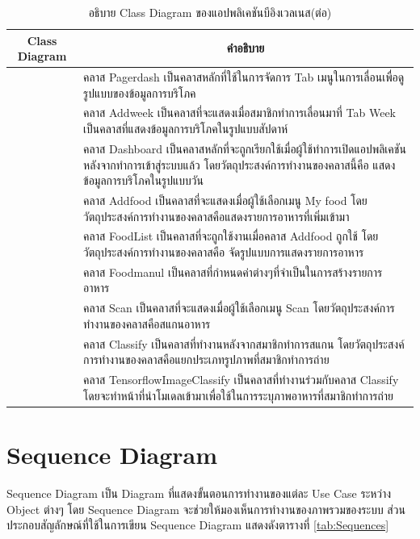 \newpage
\begin{table}[H]
	\centering
	\caption{อธิบาย Class Diagram ของแอปพลิเคชันบีอิงเวลเนส(ต่อ)}
	\label{tab:class}
	\begin{tabular}{|c|p{10cm}|}
		\hline
		\textbf{Class Diagram} & \multicolumn{1}{c|}{\textbf{คำอธิบาย}} \\ \hline
		\raisebox{-\totalheight}{Pagerdash}
		& \setstretch{1.5} {คลาส Pagerdash เป็นคลาสหลักที่ใช้ในการจัดการ Tab เมนูในการเลื่อนเพื่อดูรูปแบบของข้อมูลการบริโภค} \\ \hline
		\raisebox{-\totalheight}{Addweek}
		& \setstretch{1.5} {คลาส Addweek  เป็นคลาสที่จะแสดงเมื่อสมาชิกทำการเลื่อนมาที่ Tab Week เป็นคลาสที่แสดงข้อมูลการบริโภคในรูปแบบสัปดาห์} \\ \hline
		\raisebox{-\totalheight}{Dashboard}
		& \setstretch{1.5} {คลาส Dashboard เป็นคลาสหลักที่จะถูกเรียกใช้เมื่อผู้ใช้ทำการเปิดแอปพลิเคชันหลังจากทำการเข้าสู่ระบบแล้ว โดยวัตถุประสงค์การทำงานของคลาสนี้คือ แสดงข้อมูลการบริโภคในรูปแบบวัน} \\ \hline
		\raisebox{-\totalheight}{Addfood}
		& \setstretch{1.5} {คลาส Addfood เป็นคลาสที่จะแสดงเมื่อผู้ใช้เลือกเมนู My food โดยวัตถุประสงค์การทำงานของคลาสคือแสดงรายการอาหารที่เพิ่มเข้ามา} \\ \hline
		\raisebox{-\totalheight}{FoodList}
		& \setstretch{1.5} {คลาส FoodList เป็นคลาสที่จะถูกใช้งานเมื่อคลาส Addfood ถูกใช้ โดยวัตถุประสงค์การทำงานของคลาสคือ จัดรูปแบบการแสดงรายการอาหาร} \\ \hline
		\raisebox{-\totalheight}{Foodmanul}
		& \setstretch{1.5} {คลาส Foodmanul เป็นคลาสที่กำหนดค่าต่างๆที่จำเป็นในการสร้างรายการอาหาร} \\ \hline
		\raisebox{-\totalheight}{Scan}
		& \setstretch{1.5} {คลาส Scan เป็นคลาสที่จะแสดงเมื่อผู้ใช้เลือกเมนู Scan โดยวัตถุประสงค์การทำงานของคลาสคือสแกนอาหาร} \\ \hline
		\raisebox{-\totalheight}{Classify}
		& \setstretch{1.5} {คลาส Classify เป็นคลาสที่ทำงานหลังจากสมาชิกทำการสแกน โดยวัตถุประสงค์การทำงานของคลาสคือแยกประเภทรูปภาพที่สมาชิกทำการถ่าย} \\ \hline
		\raisebox{-\totalheight}{TensorflowImageClassify}
		& \setstretch{1.5} {คลาส TensorflowImageClassify เป็นคลาสที่ทำงานร่วมกับคลาส  Classify โดยจะทำหน้าที่นำโมเดลเข้ามาเพื่อใช้ในการระบุภาพอาหารที่สมาชิกทำการถ่าย } \\ \hline
	\end{tabular}
\end{table}

\newpage
\section{Sequence Diagram}
	Sequence Diagram เป็น Diagram ที่แสดงขั้นตอนการทำงานของแต่ละ Use Case ระหว่าง Object ต่างๆ  โดย Sequence Diagram จะช่วยให้มองเห็นการทำงานของภาพรวมของระบบ ส่วนประกอบสัญลักษณ์ที่ใช้ในการเขียน Sequence Diagram 
	แสดงดังตารางที่ \ref{tab:Sequences}
	
